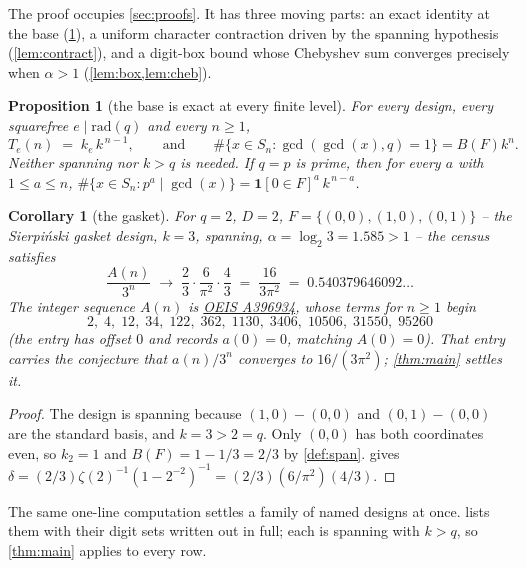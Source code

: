 \documentclass[11pt]{amsart}
\newtheorem{proposition}[theorem]{Proposition}
\newtheorem{corollary}[theorem]{Corollary}
\theoremstyle{definition}
\theoremstyle{remark}
\begin{document}
The proof occupies \cref{sec:proofs}. It has three moving parts: an exact identity at the base (\cref{prop:base}), a uniform character contraction driven by the spanning hypothesis (\cref{lem:contract}), and a digit-box bound whose Chebyshev sum converges precisely when $\alpha>1$ (\cref{lem:box,lem:cheb}).

\begin{proposition}[the base is exact at every finite level]
\label{prop:base}
For every design, every squarefree $e \mid \mathrm{rad}(q)$ and every $n \ge 1$,
\[
  T_e(n) \;=\; k_e\,k^{\,n-1},
  \qquad\text{and}\qquad
  \#\{x \in S_n : \gcd(\gcd(x), q) = 1\} = B(F)k^{n}.
\]
Neither spanning nor $k>q$ is needed. If $q=p$ is prime, then for every $a$ with $1 \le a \le n$,
$\#\{x \in S_n : p^{a} \mid \gcd(x)\} = \mathbf{1}[0 \in F]^{a}\,k^{\,n-a}$.
\end{proposition}

\begin{corollary}[the gasket]
\label{cor:gasket}
For $q=2$, $D=2$, $F = \{(0,0),(1,0),(0,1)\}$ -- the Sierpi\'nski gasket design, $k=3$, spanning, $\alpha = \log_2 3 = 1.585 > 1$ -- the census satisfies
\[
  \frac{A(n)}{3^{n}} \;\longrightarrow\; \frac{2}{3}\cdot\frac{6}{\pi^{2}}\cdot\frac{4}{3}
  \;=\; \frac{16}{3\pi^{2}} \;=\; 0.540379646092\ldots
\]
The integer sequence $A(n)$ is \href{https://oeis.org/A396934}{OEIS A396934}, whose terms for $n \ge 1$ begin
\[
  2,\; 4,\; 12,\; 34,\; 122,\; 362,\; 1130,\; 3406,\; 10506,\; 31550,\; 95260
\]
(the entry has offset $0$ and records $a(0)=0$, matching $A(0)=0$). That entry carries the conjecture that $a(n)/3^{n}$ converges to $16/(3\pi^{2})$; \cref{thm:main} settles it.
\end{corollary}

\begin{proof}
The design is spanning because $(1,0)-(0,0)$ and $(0,1)-(0,0)$ are the standard basis, and $k = 3 > 2 = q$. Only $(0,0)$ has both coordinates even, so $k_2 = 1$ and $B(F) = 1 - 1/3 = 2/3$ by \cref{def:span}.  gives $\delta = (2/3)\zeta(2)^{-1}(1-2^{-2})^{-1} = (2/3)(6/\pi^{2})(4/3)$.
\end{proof}

The same one-line computation settles a family of named designs at once.  lists them with their digit sets written out in full; each is spanning with $k>q$, so \cref{thm:main} applies to every row.
\end{document}
